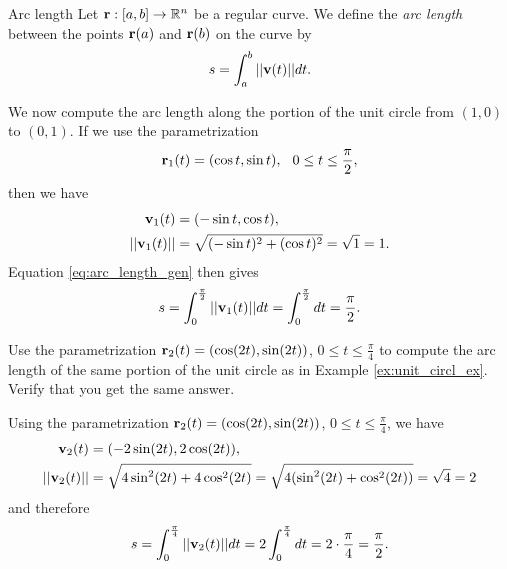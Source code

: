\documentclass[12pt,letterpaper,reqno]{article}
\numberwithin{equation}{section}
\newcommand{\R}{\ensuremath{\mathbb R}}
\newcommand{\bv}{{\bf v}}
\newcommand{\bbr}{{\bf r}}
\begin{document}
{\begin{defn}{Arc length}\label{def:arc_length}
Let $\bbr:[a,b] \to \R^n$ be a regular curve. We define the \emph{arc length} between the points $\bbr(a)$ and $\bbr(b)$ on the curve by
\begin{align*}
	s=\int_a^b||\bv(t)||dt.
\end{align*}	
\end{defn}

\begin{example}\label{ex:unit_circl_ex}
We now compute the arc length along the portion of the unit circle from $(1,0)$ to $(0,1)$. If we use the parametrization
\begin{align*}
	\bbr_1(t)=(\cos t,\sin t), \hspace{0.25cm} 0 \leq t \leq \frac{\pi}{2},
\end{align*}	
then we have
\begin{align*}
	\bv_1(t)&=(-\sin t,\cos t), \\
	||\bv_1(t)||&=\sqrt{(-\sin t)^2+(\cos t)^2}=\sqrt{1}=1.
\end{align*}
Equation \eqref{eq:arc_length_gen} then gives
\begin{align*}
	s=\int_0^{\frac{\pi}{2}}||\bv_1(t)||dt=\int_0^{\frac{\pi}{2}}dt=\frac{\pi}{2}.
\end{align*}
\end{example}

\begin{exercise}
Use the parametrization $\bbr_2(t)=(\cos(2t),\sin(2t))$, $0 \leq t \leq \frac{\pi}{4}$ to compute the arc length of the same portion of the unit circle as in Example \ref{ex:unit_circl_ex}. Verify that you get the same answer.	
\end{exercise}

{\color{red}
\begin{solution}
	Using the parametrization $\bbr_2(t)=(\cos(2t),\sin(2t))$, $0 \leq t \leq \frac{\pi}{4}$, we have
	\begin{align*}
		\bv_2(t)&=(-2\sin(2t),2\cos(2t)), \\
		||\bv_2(t)||&=\sqrt{4\sin^2(2t)+4\cos^2(2t)}=\sqrt{4(\sin^2(2t)+\cos^2(2t))}=\sqrt{4}=2
	\end{align*} 
	and therefore
	\begin{align*}
		s=\int_0^{\frac{\pi}{4}}||\bv_2(t)||dt=2\int_0^{\frac{\pi}{4}}dt=2\cdot \frac{\pi}{4}=\frac{\pi}{2}.
	\end{align*}
\end{solution}}

}
\end{document}
